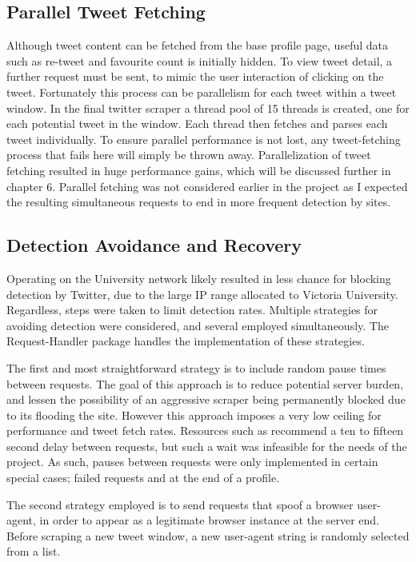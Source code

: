 \subsection{Parallel Tweet Fetching}

Although tweet content can be fetched from the base profile page, useful data such as re-tweet and favourite count is initially hidden. To view tweet detail, a further request must be sent, to mimic the user interaction of clicking on the tweet. Fortunately this process can be parallelism for each tweet within a tweet window. In the final twitter scraper a thread pool of 15 threads is created, one for each potential tweet in the window. Each thread then fetches and parses each tweet individually. To ensure parallel performance is not lost, any tweet-fetching process that fails here will simply be thrown away. Parallelization of tweet fetching resulted in huge performance gains, which will be discussed further in chapter 6. Parallel fetching was not considered earlier in the project as I expected the resulting simultaneous requests to end in more frequent detection by sites. 

\subsection{Detection Avoidance and Recovery}

Operating on the University network likely resulted in less chance for blocking detection by Twitter, due to the large IP range allocated to Victoria University. Regardless, steps were taken to limit detection rates. Multiple strategies for avoiding detection were considered, and several employed simultaneously. The Request-Handler package handles the implementation of these strategies.

The first and most straightforward strategy is to include random pause times between requests. The goal of this approach is to reduce potential server burden, and lessen the possibility of an aggressive scraper being permanently blocked due to its flooding the site. However this approach imposes a very low ceiling for performance and tweet fetch rates. Resources such as \cite{} recommend a ten to fifteen second delay between requests, but such a wait was infeasible for the needs of the project. As such, pauses between requests were only implemented in certain special cases; failed requests and at the end of a profile. 

The second strategy employed is to send requests that spoof a browser user-agent, in order to appear as a legitimate browser instance at the server end. Before scraping a new tweet window, a new user-agent string is randomly selected from a list. 

